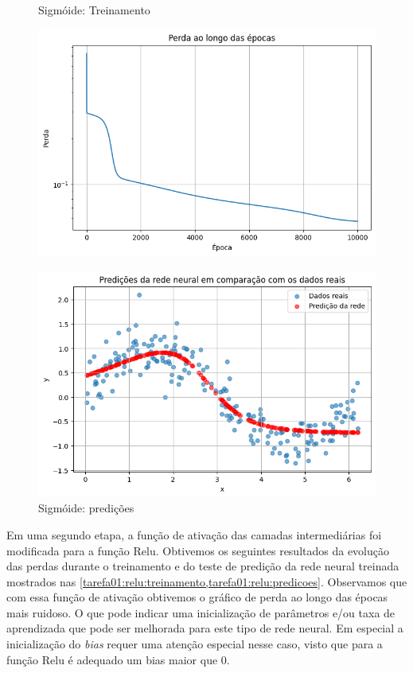 \begin{figure}[htb]
	\centering
	\begin{minipage}{0.45\textwidth}
	\centering
	\caption{Sigmóide: Treinamento} \label{tarefa01:sigmoide:treinamento}
	\includegraphics[width=\textwidth]{./0803_imgs/png-241110-142600634-18420033062344975583.png}
	\end{minipage}
	\hfill
	\begin{minipage}{0.45\textwidth}
	\centering
	\caption{Sigmóide: predições} \label{tarefa01:simoide:predicoes}
	\includegraphics[width=\textwidth]{./0803_imgs/png-241110-143132585-16405151944787820073.png}
	\end{minipage}
\end{figure}

Em uma segundo etapa, a função de ativação das camadas intermediárias foi modificada para a função Relu. Obtivemos os seguintes resultados da evolução das perdas durante o treinamento e do teste de predição da rede neural treinada mostrados nas \cref{tarefa01:relu:treinamento,tarefa01:relu:predicoes}. Observamos que com essa função de ativação obtivemos o gráfico de perda ao longo das épocas mais ruidoso. O que pode indicar uma inicialização de parâmetros e/ou taxa de aprendizada que pode ser melhorada para este tipo de rede neural. Em especial a inicialização do \emph{bias} requer uma atenção especial nesse caso, visto que para a função Relu é adequado um bias maior que 0.

